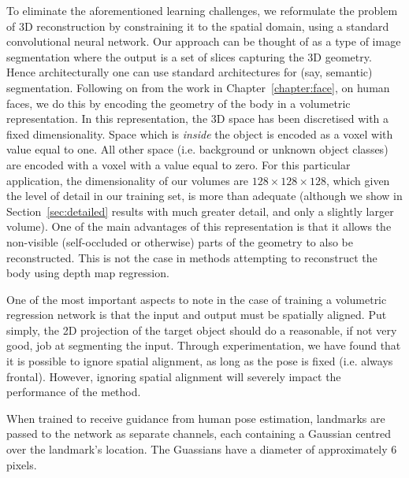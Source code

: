 To eliminate the aforementioned learning challenges, we reformulate
the problem of 3D reconstruction by constraining it to the spatial
domain, using a standard convolutional neural network. Our approach
can be thought of as a type of image segmentation where the output is
a set of slices capturing the 3D geometry. Hence architecturally one
can use standard architectures for (say, semantic)
segmentation. Following on from the work in
Chapter~\ref{chapter:face}, on human faces, we do this by encoding the
geometry of the body in a volumetric representation. In this
representation, the 3D space has been discretised with a fixed
dimensionality. Space which is \textit{inside} the object is encoded
as a voxel with value equal to one. All other space (i.e. background
or unknown object classes) are encoded with a voxel with a value equal
to zero. For this particular application, the dimensionality of our
volumes are $128\times 128\times 128$, which given the level of detail
in our training set, is more than adequate (although we show in
Section~\ref{sec:detailed} results with much greater detail, and only
a slightly larger volume). One of the main advantages of this
representation is that it allows the non-visible (self-occluded or
otherwise) parts of the geometry to also be reconstructed. This is not
the case in methods attempting to reconstruct the body using depth map
regression.


One of the most important aspects to note in the case of training a
volumetric regression network is that the input and output must be
spatially aligned. Put simply, the 2D projection of the target object
should do a reasonable, if not very good, job at segmenting the
input. Through experimentation, we have found that it is possible to
ignore spatial alignment, as long as the pose is fixed (i.e. always
frontal). However, ignoring spatial alignment will severely impact the
performance of the method.

When trained to receive guidance from human pose estimation, landmarks
are passed to the network as separate channels, each containing a
Gaussian centred over the landmark's location. The Guassians have a
diameter of approximately 6 pixels.

